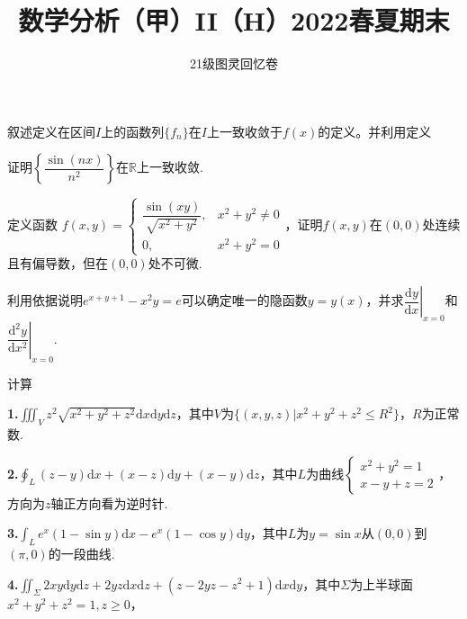\documentclass[UTF8,14pt,normal]{ctexart}
\title{\vspace{-5em}\bf 数学分析（甲）II（H）2022春夏期末}
\author{21级图灵回忆卷}
\date{\zhtoday}
\begin{document}
    \maketitle 
    
     叙述定义在区间$I$上的函数列$\{f_n\}$在$I$上一致收敛于$f(x)$的定义。并利用定义\vspace{0.6em}
    
    \noindent 证明$\left\{\dfrac{\sin(nx)}{n^2}\right\}$在$\mathbb{R}$上一致收敛.\vspace{0.5em}
    
    定义函数 $f(x, y)=\begin{cases}\dfrac{\sin(xy)}{\sqrt{x^2+y^2}}, &x^2+y^2\neq0\\0, &x^2+y^2=0\end{cases}$，证明$f(x, y)$在$(0, 0)$处连续且有偏导数，但在$(0, 0)$处不可微.\vspace{1em}
    
    利用依据说明$e^{x+y+1} -x^2y = e$可以确定唯一的隐函数$y=y(x)$，并求$\left.\dfrac{\mathrm dy}{\mathrm dx}\right|_{x=0}$和$\left.\dfrac{\mathrm d^2y}{\mathrm dx^2}\right|_{x=0}$.\vspace{1.2em}
    
    计算\vspace{1em}
    
    \textbf{1.}$\displaystyle\iiint_Vz^2\sqrt{x^2+y^2+z^2}\mathrm dx\mathrm dy\mathrm dz$，其中$V$为$\{(x, y, z)|x^2+y^2+z^2\leq R^2\}$，$R$为正常数.\vspace{0.5em}
    
    \textbf{2.}$\displaystyle\oint_L(z-y)\mathrm dx + (x-z)\mathrm dy + (x-y)\mathrm dz$，其中$L$为曲线$\begin{cases}x^2+y^2=1\\x-y+z=2\end{cases}$，方向为$z$轴正方向看为逆时针.\vspace{1em}
    
    \textbf{3.}$\displaystyle\int_Le^x(1-\sin y)\mathrm dx-e^x(1-\cos y)\mathrm dy$，其中$L$为$y=\sin x$从$(0, 0)$到$(\pi, 0)$的一段曲线.\vspace{1em}
    
    \textbf{4.}$\displaystyle\iint_\Sigma2xy\mathrm dy\mathrm dz+2yz\mathrm dx\mathrm dz+(z-2yz-z^2+1)\mathrm dx\mathrm dy$，其中$\Sigma$为上半球面$x^2+y^2+z^2=1, z\geq 0$，\vspace{-1em}
    
\end{document}
